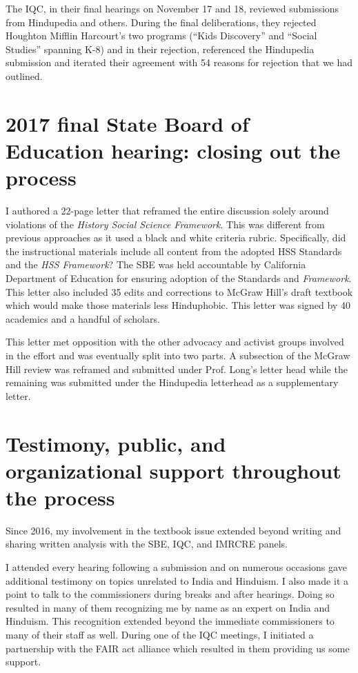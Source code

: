 The IQC, in their final hearings on November 17 and 18, reviewed submissions from Hindupedia and others. During the final deliberations, they rejected Houghton Mifflin Harcourt’s two programs (“Kids Discovery” and “Social Studies” spanning K-8) and in their rejection, referenced the Hindupedia submission and iterated their agreement with 54 reasons for rejection that we had outlined. 


\section*{2017 final State Board of Education hearing: closing out the process}

I authored a 22-page letter that reframed the entire discussion solely around violations of the \textit{History Social Science Framework}. This was different from previous approaches as it used a black and white criteria rubric. Specifically, did the instructional materials include all content from the adopted HSS Standards and the \textit{HSS Framework}? The SBE was held accountable by California Department of Education for ensuring adoption of the Standards and \textit{Framework}. This letter also included 35 edits and corrections to McGraw Hill’s draft textbook which would make those materials less Hinduphobic. This letter was signed by 40 academics and a handful of scholars. 

This letter met opposition with the other advocacy and activist groups involved in the effort and was eventually split into two parts. A subsection of the McGraw Hill review was reframed and submitted under Prof. Long’s letter head while the remaining was submitted under the Hindupedia letterhead as a supplementary letter.


\section*{Testimony, public, and organizational support throughout the process}

Since 2016, my involvement in the textbook issue extended beyond writing and sharing written analysis with the SBE, IQC, and IMRCRE panels. 

I attended every hearing following a submission and on numerous occasions gave additional testimony on topics unrelated to India and Hinduism. I also made it a point to talk to the commissioners during breaks and after hearings. Doing so resulted in many of them recognizing me by name as an expert on India and Hinduism. This recognition extended beyond the immediate commissioners to many of their staff as well. During one of the IQC meetings, I initiated a partnership with the FAIR act alliance which resulted in them providing us some support.

